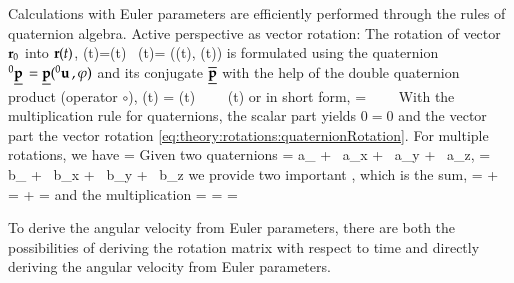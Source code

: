 %
Calculations with Euler parameters are efficiently performed through the rules of quaternion algebra.
Active perspective as vector rotation: The rotation of vector $\mathbf{r}_0$ into $\mathbf{r}(t)$,
\be \label{eq:theory:rotations:quaternionRotation}
  (t)=(t) \,  \quad {} \quad {}(t)= \Rot((t), \varphi (t))
\ee
is formulated using the quaternion $\prescript{0}{}{\underline{\mathbf{p}}}\,=\underline{\mathbf{p}}(\prescript{0}{}{\mathbf{u}}\,, \varphi)$ and its conjugate $\overline{\underline{\mathbf{p}}}$ with the help of the double quaternion product (operator $\circ$),
\be 
  (t) = (t) \, \circ \,  \, \circ \, (t) \eqComma
\ee
or in short form,
\be
{}= \, \circ \,  \, \circ \,  \eqDot
\ee
With the multiplication rule for quaternions, the scalar part yields $0=0$ and the vector part the vector rotation \eqref{eq:theory:rotations:quaternionRotation}. 
For multiple rotations, we have
\be
  = \circ {} \circ {} \circ  {} \circ {} \eqDot
\ee
Given two quaternions
\be
  \underline{\av} = a_ + \, a_x + \, a_y + \, a_z, \quad {} \quad \underline{\bv} = b_ + \, b_x + \, b_y + \, b_z \eqComma
\ee
we provide two important , which is the sum,
\be
  \underline{\cv} = \underline{\av} + \underline{\bv} \quad \ra \quad 
   =  +  =  \eqComma
\ee
and the multiplication
\be
  \underline{\cv} = \underline{\av} \circ \underline{\bv} \neq \underline{\bv} \circ \underline{\av} \quad \ra \quad
   =  \circ {} = 
    \eqDot
\ee


%
To derive the angular velocity from Euler parameters, there are both the possibilities of deriving the rotation matrix with respect to time and directly deriving the angular velocity from Euler parameters.

